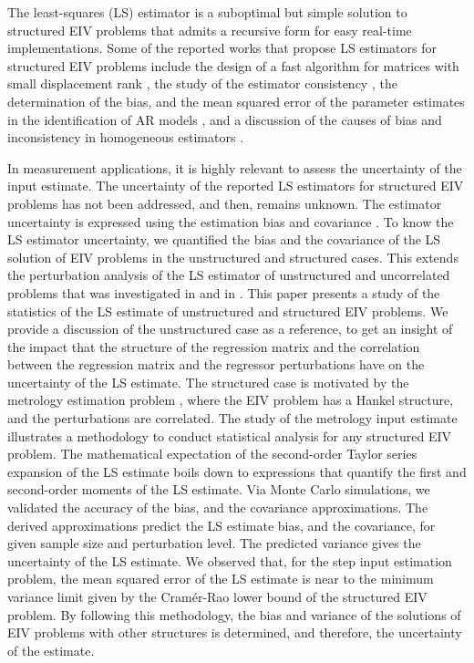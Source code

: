 The least-squares (LS) estimator is a suboptimal but simple solution to structured EIV problems that admits a recursive form for easy real-time implementations.
Some of the reported works that propose LS estimators for structured EIV problems include 
the design of a fast algorithm for matrices with small displacement rank \cite{Mastronardi07fast},
the study of the estimator consistency \cite{Palanthandalam10parameter},
the determination of the bias, and the mean squared error of the parameter estimates in the identification of AR models \cite{Kiviet12high} \cite{Kiviet14improved}, and
a discussion of the causes of bias and inconsistency in homogeneous estimators \cite{Yeredor04homogeneous}.

 In measurement applications, it is highly relevant to assess the uncertainty of the input estimate.
The uncertainty of the reported LS estimators for structured EIV problems has not been addressed, and then, remains unknown.
The estimator uncertainty is expressed using the estimation bias and covariance \cite{Pintelon12Book}.
To know the LS estimator uncertainty, we quantified the bias and the covariance of the LS solution of EIV problems in the unstructured and structured cases. 
This extends the perturbation analysis of the LS estimator of unstructured and uncorrelated problems that was investigated in \cite{Stewart90SPT} and in \cite{Vaccaro94}.
This paper presents a study of the statistics of the LS estimate of unstructured and structured EIV problems. 
 We provide a discussion of the unstructured case as a reference, to get an insight of the impact that the structure of the regression matrix and the correlation between the regression matrix and the regressor perturbations have on the uncertainty of the LS estimate.
The structured case is motivated by the metrology estimation problem \cite{Markovsky15cep}, where the EIV problem has a Hankel structure, and the perturbations are correlated.
The study of the metrology input estimate illustrates a methodology to conduct statistical analysis for any structured EIV problem.
The mathematical expectation of the second-order Taylor series expansion of the LS estimate boils down to expressions that quantify the first and second-order moments of the LS estimate.
Via Monte Carlo simulations, we validated the accuracy of the bias, and the covariance approximations.
The derived approximations predict the LS estimate bias, and the covariance, for given sample size and perturbation level.
The predicted variance gives the uncertainty of the LS estimate.
We observed that, for the step input estimation problem, the mean squared error of the LS estimate is near to the minimum variance limit given by the Cram\'er-Rao lower bound of the structured EIV problem.
 By following this methodology, the bias and variance of the solutions of EIV problems with other structures is determined, and therefore, the uncertainty of the estimate.




